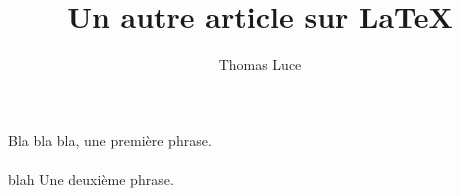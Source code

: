 \documentclass[11pt,a4paper]{article}
\title{Un autre article sur \LaTeX}
\author{Thomas Luce}
\date{}
\begin{document}
\maketitle


Bla bla bla, une première phrase.
\\
\\
blah
Une deuxième phrase.
\end{document}
